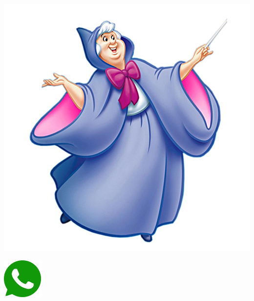 {\begin{multicols}{3}	
\begin{center}
	\includegraphics[height=.5\textheight]{./IMG-GIT/fada.jpeg}
\end{center}
\begin{flushright}
	\includegraphics[height=20mm]{./IMG-GIT/whatsapp.png}
\end{flushright}

\vfill	
\columnbreak


\end{multicols}}
